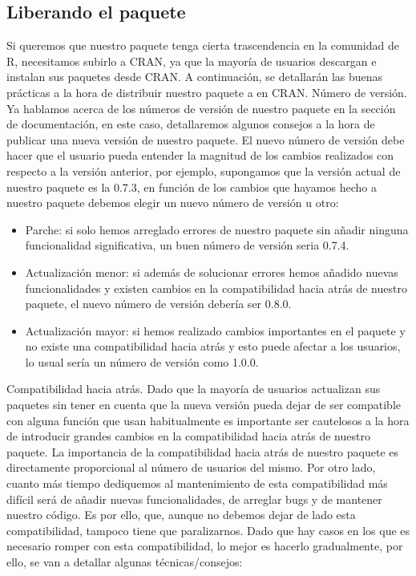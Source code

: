 \subsection{Liberando el paquete}

Si queremos que nuestro paquete tenga cierta trascendencia en la comunidad de R,
necesitamos subirlo a CRAN, ya que la mayor\'ia de usuarios descargan e instalan sus
paquetes desde CRAN.
A continuaci\'on, se detallar\'an las buenas pr\'acticas a la hora de distribuir nuestro paquete a
en CRAN.
N\'umero de versi\'on.
Ya hablamos acerca de los n\'umeros de versi\'on de nuestro paquete en la secci\'on de
documentaci\'on, en este caso, detallaremos algunos consejos a la hora de publicar una nueva
versi\'on de nuestro paquete.
El nuevo n\'umero de versi\'on debe hacer que el usuario pueda entender la magnitud de los
cambios realizados con respecto a la versi\'on anterior, por ejemplo, supongamos que la
versi\'on actual de nuestro paquete es la 0.7.3, en funci\'on de los cambios que hayamos hecho
a nuestro paquete debemos elegir un nuevo n\'umero de versi\'on u otro:

\begin{itemize}
    \item Parche: si solo hemos arreglado errores de nuestro paquete sin a\~nadir ninguna
funcionalidad significativa, un buen n\'umero de versi\'on seria 0.7.4.
    \item Actualizaci\'on menor: si adem\'as de solucionar errores hemos a\~nadido nuevas
funcionalidades y existen cambios en la compatibilidad hacia atr\'as de nuestro
paquete, el nuevo n\'umero de versi\'on deber\'ia ser 0.8.0.
    \item Actualizaci\'on mayor: si hemos realizado cambios importantes en el paquete y no
existe una compatibilidad hacia atr\'as y esto puede afectar a los usuarios, lo usual
ser\'ia un n\'umero de versi\'on como 1.0.0.
\end{itemize}

Compatibilidad hacia atr\'as.
Dado que la mayor\'ia de usuarios actualizan sus paquetes sin tener en cuenta que la nueva
versi\'on pueda dejar de ser compatible con alguna funci\'on que usan habitualmente es
importante ser cautelosos a la hora de introducir grandes cambios en la compatibilidad hacia
atr\'as de nuestro paquete.
La importancia de la compatibilidad hacia atr\'as de nuestro paquete es directamente
proporcional al n\'umero de usuarios del mismo. Por otro lado, cuanto m\'as tiempo dediquemos
al mantenimiento de esta compatibilidad m\'as dif\'icil ser\'a de a\~nadir nuevas funcionalidades,
de arreglar bugs y de mantener nuestro c\'odigo. Es por ello, que, aunque no debemos dejar
de lado esta compatibilidad, tampoco tiene que paralizarnos.
Dado que hay casos en los que es necesario romper con esta compatibilidad, lo mejor es
hacerlo gradualmente, por ello, se van a detallar algunas t\'ecnicas/consejos:

